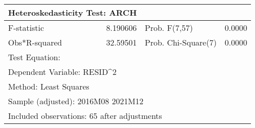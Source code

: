 \begin{tabular}{lrrrr}
\toprule
\multicolumn{2}{l}{Heteroskedasticity Test: ARCH}&\multicolumn{1}{c}{}&\multicolumn{1}{c}{}&\multicolumn{1}{c}{}\\
\midrule
\multicolumn{1}{l}{F-statistic}&\multicolumn{1}{r}{8.190606}&\multicolumn{2}{l}{Prob. F(7,57)}&\multicolumn{1}{r}{0.0000}\\
\multicolumn{1}{l}{Obs*R-squared}&\multicolumn{1}{r}{32.59501}&\multicolumn{2}{l}{Prob. Chi-Square(7)}&\multicolumn{1}{r}{0.0000}\\
\midrule
\multicolumn{1}{l}{Test Equation:}&\multicolumn{1}{c}{}&\multicolumn{1}{c}{}&\multicolumn{1}{c}{}&\multicolumn{1}{c}{}\\
\multicolumn{2}{l}{Dependent Variable: RESID\textasciicircum 2}&\multicolumn{1}{c}{}&\multicolumn{1}{c}{}&\multicolumn{1}{c}{}\\
\multicolumn{2}{l}{Method: Least Squares}&\multicolumn{1}{c}{}&\multicolumn{1}{c}{}&\multicolumn{1}{c}{}\\
\multicolumn{3}{l}{Sample (adjusted): 2016M08 2021M12}&\multicolumn{1}{c}{}&\multicolumn{1}{c}{}\\
\multicolumn{4}{l}{Included observations: 65 after adjustments}&\multicolumn{1}{c}{}\\
\bottomrule
\end{tabular}

